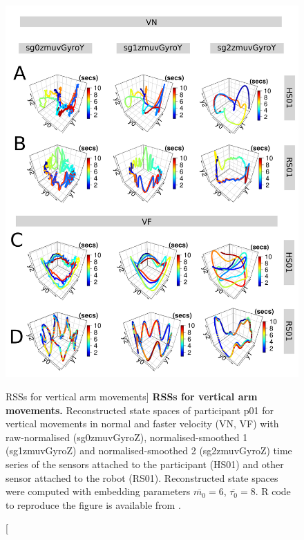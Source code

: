 \begin{figure}
\centering
\includegraphics[height=0.85\textheight]{fig_6_05}
    \caption
	[RSSs for vertical arm movements]{
	{\bf RSSs for vertical arm movements.}
	Reconstructed state spaces %
	of participant p01 for vertical movements in normal and faster 
	velocity (VN, VF) with raw-normalised (sg0zmuvGyroZ), 
	normalised-smoothed 1 (sg1zmuvGyroZ) and 
	normalised-smoothed 2 (sg2zmuvGyroZ) time series of the 
	sensors attached to the participant (HS01) and other sensor 
	attached to the robot (RS01).	
	Reconstructed state spaces were computed with 
	embedding parameters $\overline{m_0}=6$, $\overline{\tau_0}=8$.
	R code to reproduce the figure is available from \cite{hwum2018}.
        }
    \label{fig:rss_aVw10}
\end{figure}

